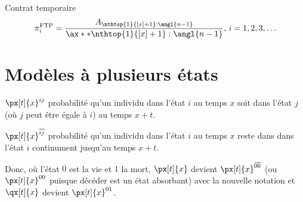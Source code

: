\documentclass[10pt, french]{article}
\begin{document}
\begin{multicols*}{2}
Contrat temporaire
\begin{align*}
	\pi^{\text{FTP}}	_{i}
	&=	\frac{A_{\nthtop{1}{[x] + 1}:\angl{n - 1}}}{\ax**{\nthtop{1}{[x] + 1}:\angl{n - 1}}}, 	\,	i = 1, 2, 3, \dots	\\
\end{align*}

\newpage

\section{Modèles à plusieurs états}

\begin{description}
	\item	$\px[t]{x}^{ij}$	probabilité qu'un individu dans l'état $i$ au temps $x$ soit dans l'état $j$ (où $j$ peut être égale à $i$) au temps $x + t$.
	\item	$\px[t]{x}^{\overline{ij}}$	probabilité qu'un individu dans l'état $i$ au temps $x$ reste dans dans l'état $i$ continument jusqu'au temps $x + t$.
\end{description}

Donc, où l'état $0$ est la vie et $1$ la mort, $\px[t]{x}$ devient $\px[t]{x}^{\overline{00}}$ (ou $\px[t]{x}^{00}$ puisque décéder est un état absorbant) avec la nouvelle notation et $\qx[t]{x}$ devient $\px[t]{x}^{01}$.


\end{multicols*}
\end{document}
